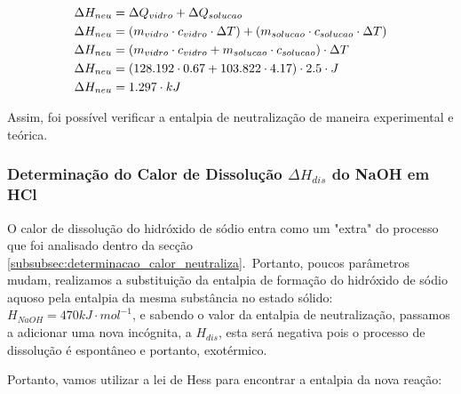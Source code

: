             \begin{equation}
                \begin{split}
                	\notag
                    \Delta{H_{neu}} &= \Delta Q_{vidro} + \Delta Q_{solucao} \\
                    \Delta{H_{neu}} &= (m_{vidro} \cdot c_{vidro} \cdot \Delta T) + (m_{solucao} \cdot c_{solucao} \cdot \Delta T) \\
                    \Delta{H_{neu}} &= (m_{vidro} \cdot c_{vidro} + m_{solucao} \cdot c_{solucao}) \cdot \Delta T \\
                    \Delta{H_{neu}} &= (128.192 \cdot 0.67 + 103.822 \cdot 4.17) \cdot 2.5 \cdot J \\
                    \Delta{H_{neu}} &= 1.297 \cdot kJ
                \end{split}
            \end{equation}

            \indent Assim, foi possível verificar a entalpia de neutralização de maneira experimental e teórica.\\
        
            
            \subsubsection{Determinação do Calor de Dissolução $\Delta{H_{dis}}$ do NaOH em HCl}\label{subsubsec:determinacao_calor_dissolucao}
            \indent O calor de dissolução do hidróxido de sódio entra como um "extra" do processo que foi analisado dentro da secção \ref{subsubsec:determinacao_calor_neutraliza}.\ Portanto, poucos parâmetros mudam, realizamos a substituição da entalpia de formação do hidróxido de sódio aquoso pela entalpia da mesma substância no estado sólido: $H_{NaOH} = 470 kJ \cdot mol^{-1}$, e sabendo o valor da entalpia de neutralização, passamos a adicionar uma nova incógnita, a $H_{dis}$, esta será negativa pois o processo de dissolução é espontâneo e portanto, exotérmico.\
            
            \indent Portanto, vamos utilizar a lei de Hess para encontrar a entalpia da nova reação:\

